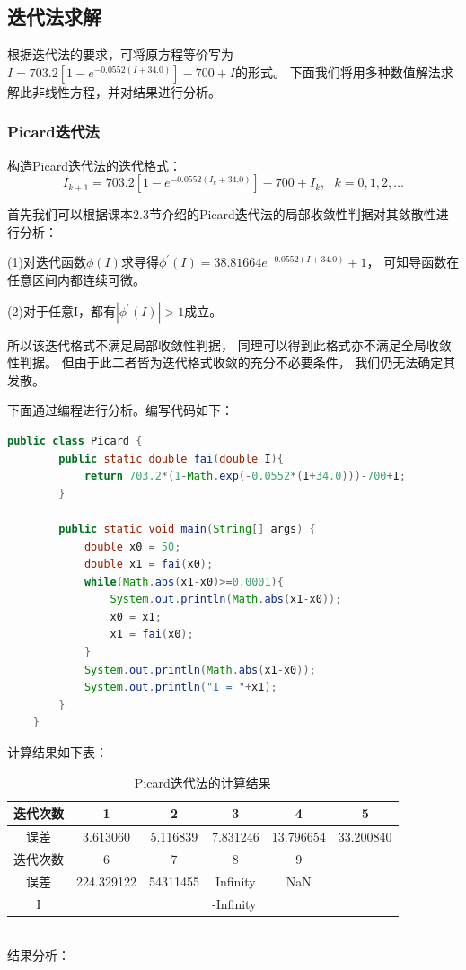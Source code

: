 \documentclass[12pt,a4paper]{article}
\begin{document}
\subsection{迭代法求解}
根据迭代法的要求，可将原方程等价写为
$I=703.2[1-e^{-0.0552(I+34.0)}]-700+I$的形式。
下面我们将用多种数值解法求解此非线性方程，并对结果进行分析。
\subsubsection{Picard迭代法}
构造Picard迭代法的迭代格式：
\begin{equation}
    I_{k+1}=703.2[1-e^{-0.0552(I_k+34.0)}]-700+I_k,~~~k=0,1,2,\dots
\end{equation}

首先我们可以根据课本2.3节介绍的Picard迭代法的局部收敛性判据对其敛散性进行分析：

(1)对迭代函数$\phi(I)$求导得$\phi^{'}(I)=38.81664e^{-0.0552(I+34.0)}+1$，
可知导函数在任意区间内都连续可微。

(2)对于任意I，都有$|\phi^{'}(I)|>1$成立。

所以该迭代格式不满足局部收敛性判据，
同理可以得到此格式亦不满足全局收敛性判据。
但由于此二者皆为迭代格式收敛的充分不必要条件，
我们仍无法确定其发散。

下面通过编程进行分析。编写代码如下：
\begin{lstlisting}[language={java}]
    public class Picard {
        public static double fai(double I){
            return 703.2*(1-Math.exp(-0.0552*(I+34.0)))-700+I;
        }
    
        public static void main(String[] args) {
            double x0 = 50;
            double x1 = fai(x0);
            while(Math.abs(x1-x0)>=0.0001){
                System.out.println(Math.abs(x1-x0));
                x0 = x1;
                x1 = fai(x0);
            }
            System.out.println(Math.abs(x1-x0));
            System.out.println("I = "+x1);
        }
    }
\end{lstlisting}

计算结果如下表：
\begin{table}[ht]
    \centering
    \begin{tabular}{|c|c|c|c|c|c|} 
     \hline
     迭代次数 & 1 & 2 & 3 & 4 & 5 \\ [0.5ex] 
     \hline
     误差 & 3.613060 & 5.116839 & 7.831246 & 13.796654 & 33.200840 \\ 
     \hline
     迭代次数 & 6 & 7 & 8 & 9 & \\
     \hline
     误差 & 224.329122 & 54311455 & Infinity & NaN & \\
     \hline
     I & \multicolumn{5}{c|}{-Infinity} \\
     \hline
    \end{tabular}
    \caption{Picard迭代法的计算结果}
    \label{table:4}
\end{table}
~\\
结果分析：
\end{document}
